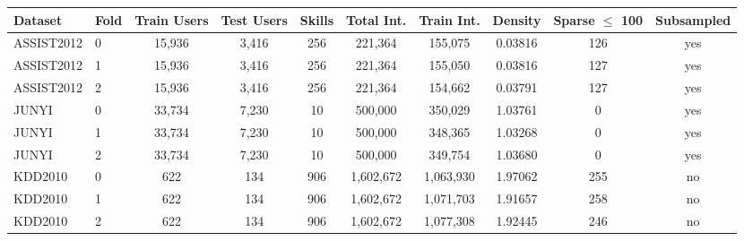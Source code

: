 \begin{tabular}{llcccccccc}
\hline
Dataset & Fold & Train Users & Test Users & Skills & Total Int. & Train Int. & Density & Sparse $\le$ 100 & Subsampled \\
\hline
ASSIST2012 & 0 & 15,936 & 3,416 & 256 & 221,364 & 155,075 & 0.03816 & 126 & yes \\
ASSIST2012 & 1 & 15,936 & 3,416 & 256 & 221,364 & 155,050 & 0.03816 & 127 & yes \\
ASSIST2012 & 2 & 15,936 & 3,416 & 256 & 221,364 & 154,662 & 0.03791 & 127 & yes \\
JUNYI & 0 & 33,734 & 7,230 & 10 & 500,000 & 350,029 & 1.03761 & 0 & yes \\
JUNYI & 1 & 33,734 & 7,230 & 10 & 500,000 & 348,365 & 1.03268 & 0 & yes \\
JUNYI & 2 & 33,734 & 7,230 & 10 & 500,000 & 349,754 & 1.03680 & 0 & yes \\
KDD2010 & 0 & 622 & 134 & 906 & 1,602,672 & 1,063,930 & 1.97062 & 255 & no \\
KDD2010 & 1 & 622 & 134 & 906 & 1,602,672 & 1,071,703 & 1.91657 & 258 & no \\
KDD2010 & 2 & 622 & 134 & 906 & 1,602,672 & 1,077,308 & 1.92445 & 246 & no \\
\hline
\end{tabular}